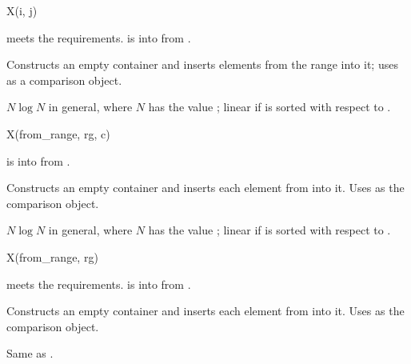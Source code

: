 %
%
%
%
\begin{itemdecl}
X(i, j)
\end{itemdecl}

\begin{itemdescr}
\pnum
\expects
{} meets the  requirements.
 is
 into  from .

\pnum
\effects
Constructs an empty container and
inserts elements from the range  into it;
uses  as a comparison object.

\pnum
\complexity
$N \log N$ in general, where $N$ has the value ;
linear if  is sorted with respect to .
\end{itemdescr}

%
%
%
%
\begin{itemdecl}
X(from_range, rg, c)
\end{itemdecl}

\begin{itemdescr}
\pnum
\expects
{} is
 into 
from .

\pnum
\effects
Constructs an empty container and
inserts each element from  into it.
Uses  as the comparison object.

\pnum
\complexity
$N \log N$ in general, where $N$ has the value ;
linear if  is sorted with respect to .
\end{itemdescr}

%
%
%
%
\begin{itemdecl}
X(from_range, rg)
\end{itemdecl}

\begin{itemdescr}
\pnum
\expects
{} meets the  requirements.
 is  into 
from .

\pnum
\effects
Constructs an empty container and
inserts each element from  into it.
Uses  as the comparison object.

\pnum
\complexity
Same as .
\end{itemdescr}

